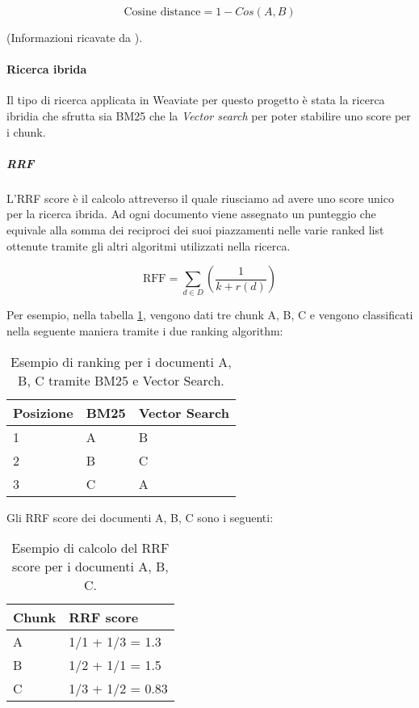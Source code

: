 \[
\text{Cosine distance} = 1-Cos(A,B)
\]

\noindent (Informazioni ricavate da \cite{site:weaviate-distance-metrics}).

\paragraph{Ricerca ibrida}
Il tipo di ricerca applicata in Weaviate per questo progetto è stata la ricerca ibridia che sfrutta sia BM25 che la \emph{Vector search} per poter stabilire uno score per i chunk.

\subparagraph{\gls{RRF}}
L'RRF score è il calcolo attreverso il quale riusciamo ad avere uno score unico per la ricerca ibrida.
Ad ogni documento viene assegnato un punteggio che equivale alla somma dei reciproci dei suoi piazzamenti nelle varie ranked list ottenute tramite gli altri algoritmi utilizzati nella ricerca.

\[
\text{RFF} = \sum_{d \in D} (\frac{1}{k+r(d)})    
\]

\noindent Per esempio, nella tabella \ref{tab:ranking}, vengono dati tre chunk A, B, C e vengono classificati nella seguente maniera tramite i due ranking algorithm:

\begin{table}[H]
    \centering
    \begin{tabular}{|p{2cm} |p{2cm} |p{2cm}|}
        \hline
        Posizione & BM25 & Vector Search \\
        \hline
        1 & A & B \\
        \hline
        2 & B & C \\
        \hline
        3 & C & A \\
        \hline
    \end{tabular}
    \caption{Esempio di ranking per i documenti A, B, C tramite BM25 e Vector Search.}
    \label{tab:ranking}
\end{table}

\noindent Gli RRF score dei documenti A, B, C sono i seguenti:
\begin{table}[H]
    \centering
    \begin{tabular}{|p{3cm} | p{3cm} |}
        \hline
        Chunk & RRF score \\
        \hline
        A & 1/1 + 1/3 = 1.3\\
        \hline
        B & 1/2 + 1/1 = 1.5\\
        \hline
        C & 1/3 + 1/2 = 0.83\\
        \hline
    \end{tabular}
    \caption{Esempio di calcolo del RRF score per i documenti A, B, C.}
    \label{tab:hybridrank}
\end{table}

